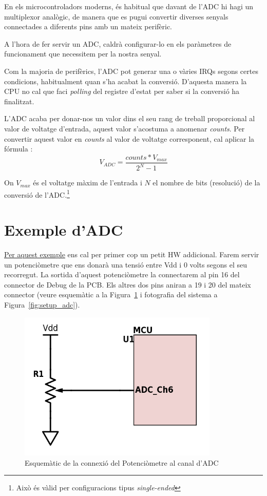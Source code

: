 En els microcontroladors moderns, és habitual que davant de l'ADC hi hagi un multiplexor analògic, de manera que es pugui convertir diverses senyals connectades a diferents pins amb un mateix perifèric.

A l'hora de fer servir un \gls{ADC}, caldrà configurar-lo en els paràmetres de funcionament que necessitem per la nostra senyal.

Com la majoria de perifèrics, l'ADC pot generar una o vàries \glspl{IRQ} segons certes condicions, habitualment quan s'ha acabat la conversió. D'aquesta manera la CPU no cal que faci {\em polling} del registre d'estat per saber si la conversió ha finalitzat.

L'ADC acaba per donar-nos un valor dins el seu rang de treball proporcional al valor de voltatge d'entrada, aquest valor s'acostuma a anomenar {\em counts}. Per convertir aquest valor en {\em counts} al valor de voltatge corresponent, cal aplicar la fórmula :
\begin{equation}
\label{eq:ADCFormula}
 V_{ADC} = \frac{{counts} * V_{max} }{2^N-1}
\end{equation}


On $V_{max}$ és el voltatge màxim de l'entrada i $N$ el nombre de bits (resolució) de la conversió de l'ADC.\footnote{Això és vàlid per configuracions tipus {\em single-ended}}

\section{Exemple d'ADC}
\label{sub:ADC_example}
\href{https://github.com/mariusmm/cursembedded/tree/master/Simplicity/ADC_1s}{Per aquest exemple} ens cal per primer cop un petit HW addicional. Farem servir un potenciòmetre que ens donarà una tensió entre Vdd i 0 volts segons el seu recorregut. La sortida d'aquest potenciòmetre la connectarem al pin 16 del connector de Debug de la PCB. Els altres dos pins aniran a 19 i 20 del mateix connector (veure esquemàtic a la Figura~\ref{fig:sch_adc} i fotografia del sistema a Figura~\ref{fig:setup_adc}).

\begin{figure}
 \centering
 \includegraphics[width=0.85\textwidth, keepaspectratio]{imatges/adc_schematic.png}
 \caption{Esquemàtic de la connexió del Potenciòmetre al canal d'\gls{ADC}}
 \label{fig:sch_adc}
\end{figure}


